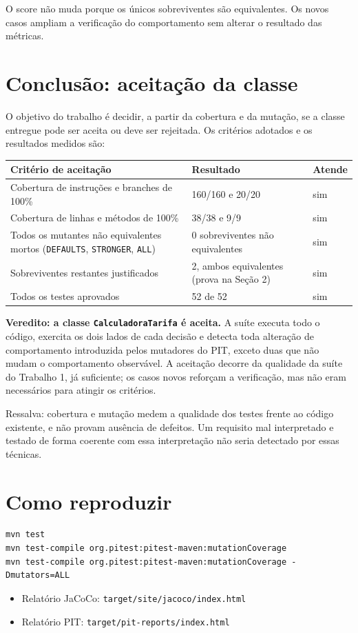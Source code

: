 \documentclass[11pt,a4paper]{article}
\begin{document}
O score não muda porque os únicos sobreviventes são equivalentes. Os novos casos
ampliam a verificação do comportamento sem alterar o resultado das métricas.

\section{Conclusão: aceitação da classe}

O objetivo do trabalho é decidir, a partir da cobertura e da mutação, se a classe
entregue pode ser aceita ou deve ser rejeitada. Os critérios adotados e os
resultados medidos são:

\begin{center}
\small
\begin{tabular}{@{}p{6.4cm} p{3.4cm} p{3.2cm}@{}}
\toprule
Critério de aceitação & Resultado & Atende \\
\midrule
Cobertura de instruções e branches de 100\% & 160/160 e 20/20 & sim \\
Cobertura de linhas e métodos de 100\% & 38/38 e 9/9 & sim \\
Todos os mutantes não equivalentes mortos (\texttt{DEFAULTS}, \texttt{STRONGER}, \texttt{ALL}) & 0 sobreviventes não equivalentes & sim \\
Sobreviventes restantes justificados & 2, ambos equivalentes (prova na Seção 2) & sim \\
Todos os testes aprovados & 52 de 52 & sim \\
\bottomrule
\end{tabular}
\end{center}

\textbf{Veredito: a classe \texttt{CalculadoraTarifa} é aceita.} A suíte executa todo
o código, exercita os dois lados de cada decisão e detecta toda alteração de
comportamento introduzida pelos mutadores do PIT, exceto duas que não mudam o
comportamento observável. A aceitação decorre da qualidade da suíte do Trabalho 1,
já suficiente; os casos novos reforçam a verificação, mas não eram necessários para
atingir os critérios.

Ressalva: cobertura e mutação medem a qualidade dos testes frente ao código
existente, e não provam ausência de defeitos. Um requisito mal interpretado e
testado de forma coerente com essa interpretação não seria detectado por essas
técnicas.

\section{Como reproduzir}

\begin{verbatim}
mvn test
mvn test-compile org.pitest:pitest-maven:mutationCoverage
mvn test-compile org.pitest:pitest-maven:mutationCoverage -Dmutators=ALL
\end{verbatim}

\begin{itemize}
\item Relatório JaCoCo: \texttt{target/site/jacoco/index.html}
\item Relatório PIT: \texttt{target/pit-reports/index.html}
\end{itemize}
\end{document}
